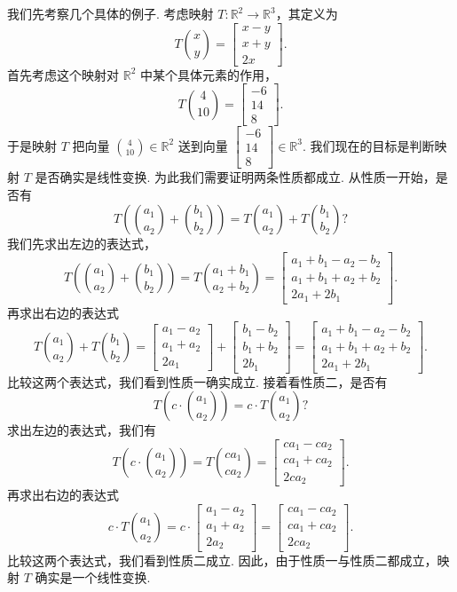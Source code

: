 我们先考察几个具体的例子. 考虑映射 $T:\mathbb{R}^2\to\mathbb{R}^3$，其定义为
\[
T\binom{x}{y}=\begin{bmatrix}x-y\\x+y\\2x\end{bmatrix}.
\]
首先考虑这个映射对 $\mathbb{R}^2$ 中某个具体元素的作用，
\[
T\binom{4}{10}=\begin{bmatrix}-6\\14\\8\end{bmatrix}.
\]
于是映射 $T$ 把向量 $\binom{4}{10}\in\mathbb{R}^2$ 送到向量 $\begin{bmatrix}-6\\14\\8\end{bmatrix}\in\mathbb{R}^3$. 我们现在的目标是判断映射 $T$ 是否确实是线性变换. 为此我们需要证明两条性质都成立. 从性质一开始，是否有
\[
T\left(\binom{a_1}{a_2}+\binom{b_1}{b_2}\right)=T\binom{a_1}{a_2}+T\binom{b_1}{b_2}?
\]
我们先求出左边的表达式，
\[
T\left(\binom{a_1}{a_2}+\binom{b_1}{b_2}\right)
=T\binom{a_1+b_1}{a_2+b_2}
=\begin{bmatrix}a_1+b_1-a_2-b_2\\a_1+b_1+a_2+b_2\\2a_1+2b_1\end{bmatrix}.
\]
再求出右边的表达式
\[
T\binom{a_1}{a_2}+T\binom{b_1}{b_2}
=\begin{bmatrix}a_1-a_2\\a_1+a_2\\2a_1\end{bmatrix}+\begin{bmatrix}b_1-b_2\\b_1+b_2\\2b_1\end{bmatrix}
=\begin{bmatrix}a_1+b_1-a_2-b_2\\a_1+b_1+a_2+b_2\\2a_1+2b_1\end{bmatrix}.
\]
比较这两个表达式，我们看到性质一确实成立. 接着看性质二，是否有
\[
T\left(c\cdot\binom{a_1}{a_2}\right)=c\cdot T\binom{a_1}{a_2}?
\]
求出左边的表达式，我们有
\[
T\left(c\cdot\binom{a_1}{a_2}\right)
=T\binom{ca_1}{ca_2}
=\begin{bmatrix}ca_1-ca_2\\ca_1+ca_2\\2ca_2\end{bmatrix}.
\]
再求出右边的表达式
\[
c\cdot T\binom{a_1}{a_2}
=c\cdot\begin{bmatrix}a_1-a_2\\a_1+a_2\\2a_2\end{bmatrix}
=\begin{bmatrix}ca_1-ca_2\\ca_1+ca_2\\2ca_2\end{bmatrix}.
\]
比较这两个表达式，我们看到性质二成立. 因此，由于性质一与性质二都成立，映射 $T$ 确实是一个线性变换.

